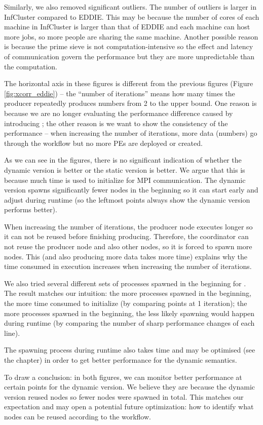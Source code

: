 Similarly, we also removed significant outliers. The number of outliers is larger in InfCluster compared to EDDIE. This may be because the number of cores of each machine in InfCluster is larger than that of EDDIE and each machine can host more jobs, so more people are sharing the same machine. Another possible reason is because the prime sieve is not computation-intensive so the effect and latency of communication govern the performance but they are more unpredictable than the computation.

The horizontal axis in these figures is different from the previous figures (\eg Figure \ref{fig:xcorr_eddie}) -- the ``number of iterations'' means how many times the producer repeatedly produces numbers from 2 to the upper bound. One reason is because we are no longer evaluating the performance difference caused by introducing \tincdep; the other reason is we want to show the consistency of the performance -- when increasing the number of iterations, more data (numbers) go through the workflow but no more PEs are deployed or created.

As we can see in the figures, there is no significant indication of whether the dynamic version is better or the static version is better. We argue that this is because much time is used to initialize for MPI communication. The dynamic version spawns significantly fewer nodes in the beginning so it can start early and adjust during runtime (so the leftmost points always show the dynamic version performs better). 

When increasing the number of iterations, the producer node executes longer so it can not be reused before finishing producing. Therefore, the coordinator can not reuse the producer node and also other nodes, so it is forced to spawn more nodes. This (and also producing more data takes more time) explains why the time consumed in execution increases when increasing the number of iterations.

We also tried several different sets of processes spawned in the beginning for \tdynexp. The result matches our intuition: the more processes spawned in the beginning, the more time consumed to initialize (by comparing points at 1 iteration); the more processes spawned in the beginning, the less likely spawning would happen during runtime (by comparing the number of sharp performance changes of each line).

The spawning process during runtime also takes time and may be optimised (see the  chapter) in order to get better performance for the dynamic semantics.

To draw a conclusion: in both figures, we can monitor better performance at certain points for the dynamic version. We believe they are because the dynamic version reused nodes so fewer nodes were spawned in total. This matches our expectation and may open a potential future optimization: how to identify what nodes can be reused according to the workflow.
